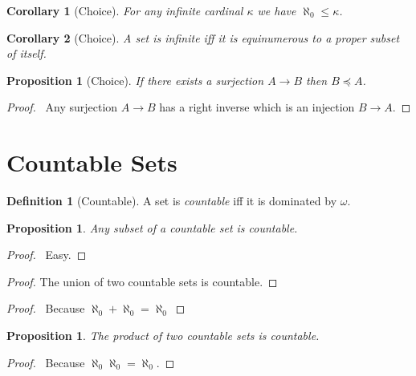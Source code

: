 \documentclass{report}
\let\qed\relax
\newtheorem{proposition}[axiom]{Proposition}
\newtheorem{corollary}{Corollary}[axiom]
\theoremstyle{definition}
\newtheorem{definition}[axiom]{Definition}
\begin{document}
    \begin{corollary}[Choice]
        For any infinite cardinal $\kappa$ we have $\aleph_0 \leq \kappa$.
    \end{corollary}

    \begin{corollary}[Choice]
        A set is infinite iff it is equinumerous to a proper subset of itself.
    \end{corollary}
    
    \begin{proposition}[Choice]
        If there exists a surjection $A \rightarrow B$ then $B \preccurlyeq A$.
    \end{proposition}

    \begin{proof}
        \pf\ Any surjection $A \rightarrow B$ has a right inverse which is an injection $B \rightarrow A$.
    \end{proof}
    \section{Countable Sets}

    \begin{definition}[Countable]
        A set is \emph{countable} iff it is dominated by $\omega$.
    \end{definition}

    \begin{proposition}
        Any subset of a countable set is countable.
    \end{proposition}

    \begin{proof}
        \pf\ Easy. \qed
    \end{proof}

    \begin{proof}
        The union of two countable sets is countable.
    \end{proof}

    \begin{proof}
        \pf\ Because $\aleph_0 + \aleph_0 = \aleph_0$ \qed
    \end{proof}

    \begin{proposition}
        The product of two countable sets is countable.
    \end{proposition}

    \begin{proof}
        \pf\ Because $\aleph_0 \aleph_0 = \aleph_0$. \qed
    \end{proof}
\end{document}

